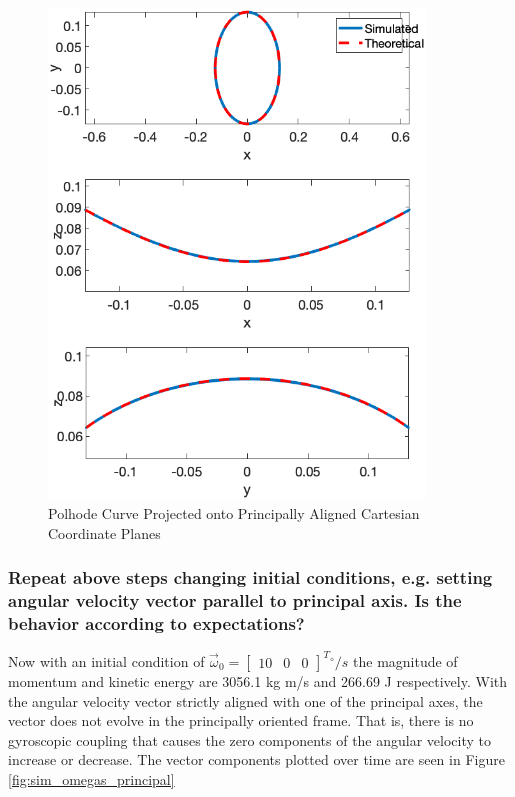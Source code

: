 \begin{figure}[H]
    \centering
    \captionsetup{justification = centering}
    \includegraphics[width = 10cm]{Images/planar_polhode_random.png}
    \caption{Polhode Curve Projected onto Principally Aligned Cartesian Coordinate Planes}
    \label{fig:2d_polhode}
\end{figure}

\subsubsection{Repeat above steps changing initial conditions, e.g. setting angular velocity vector parallel to principal axis. Is the behavior according to expectations?} \label{sec:principally_aligned_omega}

Now with an initial condition of $\vec{\omega}_0 = \begin{bmatrix}
    10 & 0 & 0
\end{bmatrix}^T {}^{\circ}/s$ the magnitude of momentum and kinetic energy are 3056.1 kg m/s and 266.69 J respectively. With the angular velocity vector strictly aligned with one of the principal axes, the vector does not evolve in the principally oriented frame. That is, there is no gyroscopic coupling that causes the zero components of the angular velocity to increase or decrease. The vector components plotted over time are seen in Figure \ref{fig:sim_omegas_principal} 

